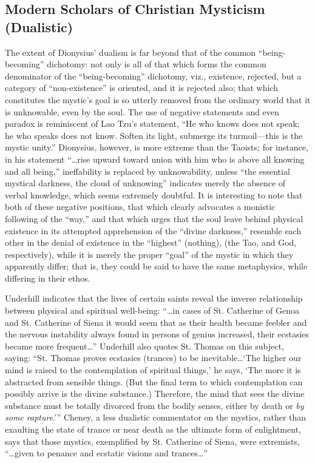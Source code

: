 \subsection{Modern Scholars of Christian Mysticism (Dualistic)}

The extent of Dionysius' dualism is far beyond that of the
common \enquote{being-becoming} dichotomy: not only is all of that
which forms the common denominator of the \enquote{being-becoming}
dichotomy, viz., existence, rejected, but a category of \enquote{non-existence}
is oriented, and it is rejected also; that which
constitutes the mystic's goal is so utterly removed from the
ordinary world that it is unknowable, even by the soul. The
use of negative statements and even paradox is reminiscent
of Lao Tzu's statement, \enquote{He who knows does not speak; he who
speaks does not know. Soften its light, submerge its turmoil---this
is the mystic unity.}\supercite{browne:great-scriptures}
Dionysius, however, is more extreme than the Taoists; for instance, in his statement
\enquote{\dots rise upward
toward union with him who is above all knowing
and all being,}\supercite{cheney:walked-with-god}
ineffability is replaced by unknowability, unless
\enquote{the essential mystical darkness, the cloud of unknowing}
indicates merely the absence of verbal knowledge,
which seems extremely doubtful. It is interesting to note
that both of these negative positions, that which clearly
advocates a monistic following of the \enquote{way,} and that which
urges that the soul leave behind physical existence in its
attempted apprehension of the \enquote{divine darkness,} resemble
each other in the denial of existence in the \enquote{highest} (nothing),
(the Tao, and God, respectively), while it is merely
the proper \enquote{goal} of the mystic in which they apparently
differ; that is, they could be said to have the same metaphysics,
while differing in their ethos.

Underhill indicates that the lives of certain saints
reveal the inverse relationship between physical and spiritual
well-being: \enquote{\dots in cases of St. Catherine of Genoa
and St. Catherine of Siena it would seem that as their health
became feebler and the nervous instability always found in
persons of genius increased, their ecstasies became more
frequent\dots}\supercite{underhill:mysticism}
Underhill also quotes St. Thomas on this subject,
saying: \enquote{St. Thomas proves ecstasies (trances) to be
inevitable\dots \enquote*{The higher our mind is raised to the contemplation
of spiritual things,} he says, \enquote*{The more it is abstracted from sensible things.
(But the final term to which contemplation can possibly arrive is the divine substance.)
Therefore, the mind that sees the divine substance must be
totally divorced from the bodily senses, either by death or
\emph{by some rapture}.}}\supercite{underhill:mysticism}
Cheney, a less dualistic commentator on
the mystics, rather than exaulting the state of trance or
near death as the ultimate form of enlightment, says that
those mystics, exemplified by St. Catherine of Siena, were
extremists, \enquote{\dots given to penance and ecstatic visions and
trances\dots}\supercite{cheney:walked-with-god}


